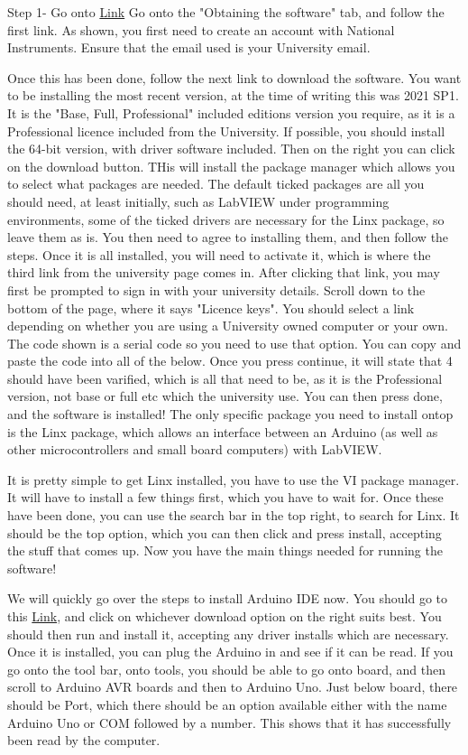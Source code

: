 \documentclass[a4paper,11pt]{report}
\begin{document}
Step 1- Go onto \href{https://www.york.ac.uk/it-services/software/a-z/labview/#tab-1}{Link}
Go onto the "Obtaining the software" tab, and follow the first link. As shown, you first need to create an account with National Instruments. Ensure that the email used is your University email.

Once this has been done, follow the next link to download the software. You want to be installing the most recent version, at the time of writing this was 2021 SP1. It is the "Base, Full, Professional" included editions version you require, as it is a Professional licence included from the University. If possible, you should install the 64-bit version, with driver software included. Then on the right you can click on the download button. THis will install the package manager which allows you to select what packages are needed. The default ticked packages are all you should need, at least initially, such as LabVIEW under programming environments, some of the ticked drivers are necessary for the Linx package, so leave them as is. You then need to agree to installing them, and then follow the steps. Once it is all installed, you will need to activate it, which is where the third link from the university page comes in. After clicking that link, you may first be prompted to sign in with your university details. Scroll down to the bottom of the page, where it says "Licence keys". You should select a link depending on whether you are using a University owned computer or your own. The code shown is a serial code so you need to use that option. You can copy and paste the code into all of the below. Once you press continue, it will state that 4 should have been varified, which is all that need to be, as it is the Professional version, not base or full etc which the university use. You can then press done, and the software is installed! The only specific package you need to install ontop is the Linx package, which allows an interface between an Arduino (as well as other microcontrollers and small board computers) with LabVIEW.

It is pretty simple to get Linx installed, you have to use the VI package manager. It will have to install a few things first, which you have to wait for. Once these have been done, you can use the search bar in the top right, to search for Linx. It should be the top option, which you can then click and press install, accepting the stuff that comes up. Now you have the main things needed for running the software!

We will quickly go over the steps to install Arduino IDE now. You should go to this \href{https://www.arduino.cc/en/software}{Link}, and click on whichever download option on the right suits best. You should then run and install it, accepting any driver installs which are necessary. Once it is installed, you can plug the Arduino in and see if it can be read. If you go onto the tool bar, onto tools, you should be able to go onto board, and then scroll to Arduino AVR boards and then to Arduino Uno. Just below board, there should be Port, which there should be an option available either with the name Arduino Uno or COM followed by a number. This shows that it has successfully been read by the computer.
\end{document}
